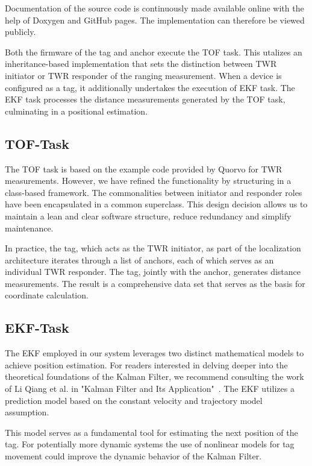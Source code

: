 \documentclass[conference, a4paper]{IEEEtran}
\begin{document}
Documentation of the source code is continuously made available online with the help of Doxygen and GitHub pages.
The implementation can therefore be viewed publicly\cite{doxygen-doku}.

Both the firmware of the tag and anchor execute the \ac{TOF} task.
This utalizes an inheritance-based implementation that sets the distinction between \ac{TWR} initiator or \ac{TWR} responder of the ranging measurement.
When a device is configured as a tag,
it additionally undertakes the execution of \ac{EKF} task.
The \ac{EKF} task processes the distance measurements generated by the \ac{TOF} task,
culminating in a positional estimation.

\subsection{TOF-Task}\label{section:firmware-tof}
The \ac{TOF} task is based on the example code
provided by Quorvo for \ac{TWR} measurements.
However, we have refined the functionality by structuring in a class-based framework.
The commonalities between initiator and responder roles have been
encapsulated in a common superclass.
This design decision allows us to maintain a lean and clear software structure,
reduce redundancy and simplify maintenance.

In practice, the tag, which acts as the \ac{TWR} initiator, as part of the localization architecture iterates through a list of anchors, each of which serves as an individual \ac{TWR} responder. 
The tag, jointly with the anchor, generates distance measurements. 
The result is a comprehensive data set that serves as the basis for coordinate calculation. 

\subsection{EKF-Task}\label{section:firmware-ekf}
The \ac{EKF} employed in our system leverages two distinct mathematical models
to achieve position estimation.
For readers interested in delving deeper into the theoretical foundations of the
Kalman Filter, we recommend consulting the work of Li Qiang et al. in
"Kalman Filter and Its Application"~\cite{Kalman}.
The \ac{EKF} utilizes a prediction model based on the constant velocity and trajectory model assumption.

This model serves as a fundamental tool for estimating the next position of the tag.
For potentially more dynamic systems the use of nonlinear models
for tag movement could improve the dynamic behavior of the Kalman Filter.
\end{document}
